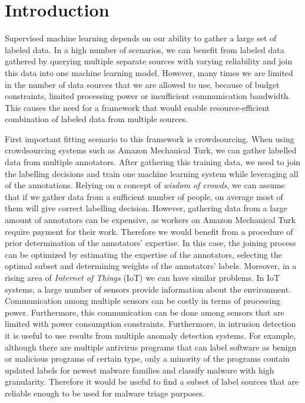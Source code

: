 \documentclass{llncs}
\begin{document}
\section{Introduction}
Supervised machine learning depends on our ability to gather a large set of labeled data. In a high number of scenarios, we can benefit from labeled data gathered by querying multiple separate sources with varying reliability and join this data into one machine learning model. However, many times we are limited in the number of data sources that we are allowed to use, because of budget constraints, limited processing power or insufficient communication bandwidth. This causes the need for a framework that would enable resource-efficient combination of labeled data from multiple sources.

First important fitting scenario to this framework is crowdsourcing. When using crowdsourcing systems such as Amazon Mechanical Turk, we can gather labelled data from multiple annotators. After gathering this training data, we need to join the labelling decisions and train one machine learning system while leveraging all of the annotations. Relying on a concept of \textit{wisdom of crowds}, we can assume that if we gather data from a sufficient number of people, on average most of them will give correct labelling decision. However, gathering data from a large amount of annotators can be expensive, as workers on Amazon Mechanical Turk require payment for their work. Therefore we would benefit from a procedure of prior determination of the annotators' expertise. In this case, the joining process can be optimized by estimating the expertise of the annotators, selecting the optimal subset and determining weights of the annotators' labels. Moreover, in a rising area of \textit{Internet of Things} (IoT) we can have similar problems. In IoT systems, a large number of sensors provide information about the environment. Communication among multiple sensors can be costly in terms of processing power. Furthermore, this communication can be done among sensors that are limited with power consumption constraints. Furthermore, in intrusion detection it is useful to use results from multiple anomaly detection systems. For example, although there are multiple antivirus programs that can label software as benign or malicious programs of certain type, only a minority of the programs contain updated labels for newest malware families and classify malware with high granularity. Therefore it would be useful to find a subset of label sources that are reliable enough to be used for malware triage purposes.
\end{document}
